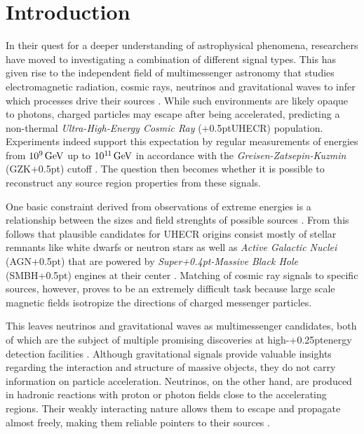 \chapter{Introduction}
\label{ch:introduction}

In their quest for a deeper understanding of astrophysical phenomena, researchers have moved to investigating
a combination of different signal types. This has given rise to the independent field of multimessenger astronomy
that studies electromagnetic radiation, cosmic rays, neutrinos and gravitational waves to infer which processes
drive their sources \cite{Meszaros_2019}. While such environments are likely opaque to photons, charged
particles may escape after being accelerated, predicting a non-thermal \emph{Ultra-High-Energy Cosmic Ray}
({\kern+0.5pt}UHECR) population. Experiments indeed support this expectation by regular measurements of
energies from $10^{9}{\kern+1.5pt}\unit{\giga\electronvolt}$ up to
$10^{1{\kern-0.3pt}1}{\kern+1.5pt}\unit{\giga\electronvolt}$ in accordance
with the \emph{Greisen-Zatsepin-Kuzmin} (GZK{\kern+0.5pt}) cutoff \cite{pa}. The question then becomes
whether it is possible to reconstruct any source region properties from these signals.

One basic constraint derived from observations of extreme energies is a relationship between the sizes and field
strenghts of possible sources \cite{Hillas_1984}. From this follows that plausible candidates for UHECR origins
consist mostly of stellar remnants like white dwarfs or neutron stars as well as \emph{Active Galactic Nuclei}
(AGN{\kern+0.5pt}) that are powered by \emph{Super{\kern+0.4pt}-Massive Black Hole} (SMBH{\kern+0.5pt}) engines
at their center \cite{Tjus_2020, Gabici_2019, Drury_2012}. Matching of cosmic ray signals to specific sources,
however, proves to be an extremely difficult task because large scale magnetic fields isotropize the directions
of charged messenger particles.

This leaves neutrinos and gravitational waves as multimessenger candidates, both of which are the subject of multiple
promising discoveries at high-{\kern+0.25pt}energy detection facilities \cite{ic_first_evidence, ic_more_evidence, ligo}.
Although gravitational signals provide valuable insights regarding the interaction and structure of massive objects,
they do not carry information on particle acceleration. Neutrinos, on the other hand, are produced in hadronic
reactions with proton or photon fields close to the accelerating regions. Their weakly interacting nature allows them
to escape and propagate almost freely, making them reliable pointers to their sources \cite{Becker_2008}.

